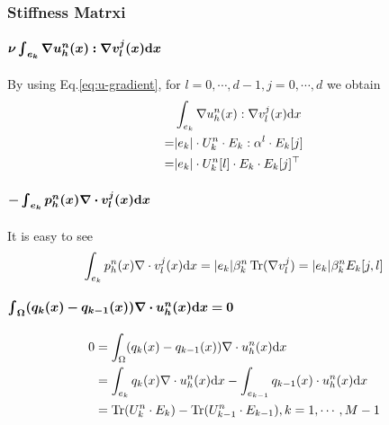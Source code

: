 \subsubsection{Stiffness Matrxi}
\paragraph{$\bm{\nu\int_{e_k}\nabla u_h^n(x):\nabla v^j_l(x)\mathrm{d} x}$} 
By using Eq.\eqref{eq:u-gradient}, for $l=0,\cdots,d-1,j=0,\cdots,d$ we obtain
\begin{equation}
  \begin{split}
    &\int_{e_k}\nabla u_h^n(x):\nabla v^j_l(x)\mathrm{d} x \\
    =& |e_k|\cdot U_k^n\cdot E_k:\alpha^l\cdot E_k[j] \\
    =& |e_k|\cdot U_k^n[l]\cdot E_k\cdot E_k[j]^\top
  \end{split}
\end{equation}

\paragraph{$\bm{-\int_{e_k}p_h^n(x)\nabla\cdot v^j_l(x)\mathrm{d} x}$}
It is easy to see
\begin{equation}
  \int_{e_k}p_h^n(x)\nabla\cdot v^j_l(x)\mathrm{d} x=|e_k|\beta_k^n\operatorname*{Tr}(\nabla v^j_l)=|e_k|\beta_k^nE_k[j,l] 
\end{equation}
\paragraph{$\bm{\int_{\Omega}(q_k(x)-q_{k-1}(x))\nabla\cdot u_h^n(x)\mathrm{d} x=0}$}
\begin{equation}
  \begin{split}
    0&=\int_{\Omega}(q_k(x)-q_{k-1}(x))\nabla\cdot u_h^n(x)\mathrm{d} x \\
    &=\int_{e_k}q_k(x)\nabla\cdot u_h^n(x)\mathrm{d} x-\int_{e_{k-1}}q_{k-1}(x)\cdot u_h^n(x)\mathrm{d} x \\
    &=\operatorname*{Tr}(U_k^n\cdot E_k)-\operatorname*{Tr}(U_{k-1}^n\cdot E_{k-1}),k=1,\cdots,M-1
  \end{split}
\end{equation}

